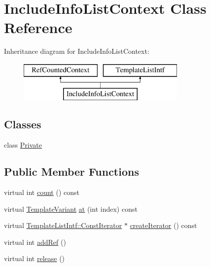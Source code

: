 \hypertarget{class_include_info_list_context}{}\section{Include\+Info\+List\+Context Class Reference}
\label{class_include_info_list_context}
Inheritance diagram for Include\+Info\+List\+Context\+:\begin{figure}[H]
\begin{center}
\leavevmode
\includegraphics[height=2.000000cm]{class_include_info_list_context}
\end{center}
\end{figure}
\subsection*{Classes}
\begin{DoxyCompactItemize}
\item 
class \mbox{\hyperlink{class_include_info_list_context_1_1_private}{Private}}
\end{DoxyCompactItemize}
\subsection*{Public Member Functions}
\begin{DoxyCompactItemize}
\item 
virtual int \mbox{\hyperlink{class_include_info_list_context_ac641c82aaf5644cfcfc1e1650f536096}{count}} () const
\item 
virtual \mbox{\hyperlink{class_template_variant}{Template\+Variant}} \mbox{\hyperlink{class_include_info_list_context_abdbdfb96f30dc9a64e42e01154fd30ff}{at}} (int index) const
\item 
virtual \mbox{\hyperlink{class_template_list_intf_1_1_const_iterator}{Template\+List\+Intf\+::\+Const\+Iterator}} $\ast$ \mbox{\hyperlink{class_include_info_list_context_a205c178e2b416a8fc6779eca9aaddf33}{create\+Iterator}} () const
\item 
virtual int \mbox{\hyperlink{class_include_info_list_context_ab45ef3751c5ce2e342a23d8a240cee07}{add\+Ref}} ()
\item 
virtual int \mbox{\hyperlink{class_include_info_list_context_a8791d673ef9ceb58785f1bf729d53ed1}{release}} ()
\end{DoxyCompactItemize}
